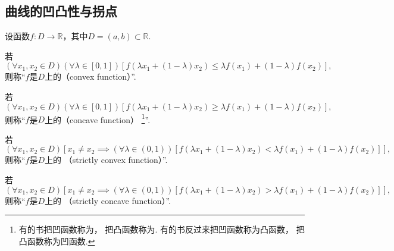 \subsection{曲线的凹凸性与拐点}
\begin{definition}\label{definition:函数图像的绘制.凹凸性的定义}
设函数\(f\colon D\to\mathbb{R}\)，其中\(D=(a,b)\subset\mathbb{R}\).

若\begin{equation*}
	(\forall x_1,x_2 \in D)
	(\forall \lambda \in [0,1])
	[
		f(\lambda x_1 + (1-\lambda) x_2)
		\leq
		\lambda f(x_1) + (1-\lambda) f(x_2)
	],
\end{equation*}
则称“\(f\)是\(D\)上的（convex function）”.

若\begin{equation*}
	(\forall x_1,x_2 \in D)
	(\forall \lambda \in [0,1])
	[
		f(\lambda x_1 + (1-\lambda) x_2)
		\geq
		\lambda f(x_1) + (1-\lambda) f(x_2)
	],
\end{equation*}
则称“\(f\)是\(D\)上的（concave function）
\footnote{有的书把凹函数称为，
把凸函数称为.
有的书反过来把凹函数称为凸函数，
把凸函数称为凹函数.
}”.

若\begin{equation*}
	(\forall x_1,x_2 \in D)
	[
		x_1 \neq x_2
		\implies
		(\forall \lambda \in (0,1))
		[
			f(\lambda x_1 + (1-\lambda) x_2)
			<
			\lambda f(x_1) + (1-\lambda) f(x_2)
		]
	],
\end{equation*}
则称“\(f\)是\(D\)上的%
（strictly convex function）”.

若\begin{equation*}
	(\forall x_1,x_2 \in D)
	[
		x_1 \neq x_2
		\implies
		(\forall \lambda \in (0,1))
		[
			f(\lambda x_1 + (1-\lambda) x_2)
			>
			\lambda f(x_1) + (1-\lambda) f(x_2)
		]
	],
\end{equation*}
则称“\(f\)是\(D\)上的%
（strictly concave function）”.
\end{definition}

